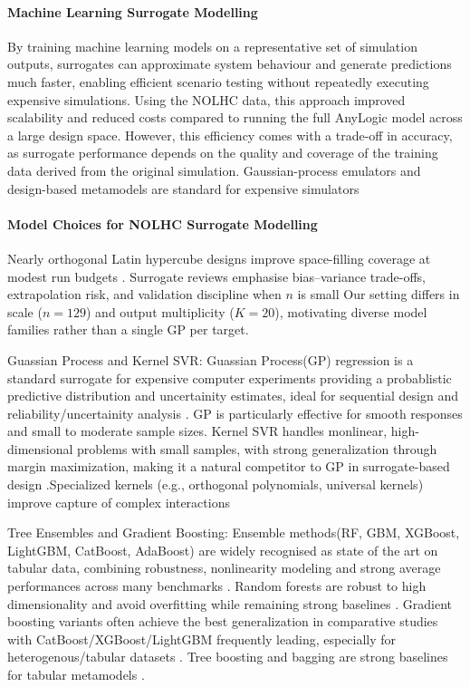 \documentclass[12pt,twocolumn,a4paper]{article}
\theoremstyle{plain}
\theoremstyle{definition}
\theoremstyle{remark}
\begin{document}
\paragraph{Machine Learning Surrogate Modelling}
By training machine learning models on a representative set of simulation outputs, surrogates can approximate system behaviour and generate predictions much faster, enabling efficient scenario testing without repeatedly executing expensive simulations. Using the NOLHC data, this approach improved scalability and reduced costs compared to running the full AnyLogic model across a large design space. However, this efficiency comes with a trade-off in accuracy, as surrogate performance depends on the quality and coverage of the training data derived from the original simulation. Gaussian-process emulators and design-based metamodels are standard for expensive simulators 

\paragraph{Model Choices for NOLHC Surrogate Modelling}
Nearly orthogonal Latin hypercube designs improve space-filling coverage at modest run budgets \citep{cioppa2007,viana2016,bogoclu2021}.
Surrogate reviews emphasise bias--variance trade-offs, extrapolation risk, and validation discipline when $n$ is small 
Our setting differs in scale ($n{=}129$) and output multiplicity ($K{=}20$), motivating diverse model families rather than a single GP per target.
\item Guassian Process and Kernel SVR: Guassian Process(GP) regression is a standard surrogate for expensive computer experiments providing a probablistic predictive distribution and uncertainity estimates, ideal for sequential design and reliability/uncertainity analysis \citep{marrel2024, bogoclu2021, Cheng2017 }. GP is particularly effective for smooth responses and small to moderate sample sizes. Kernel SVR handles monlinear, high-dimensional problems with small samples, with strong generalization through margin maximization, making it a natural competitor to GP in surrogate-based design \citep{Cheng2017}.Specialized kernels (e.g., orthogonal polynomials, universal kernels) improve capture of complex interactions \citep{Ustun2006}

\item Tree Ensembles and Gradient Boosting: Ensemble methods(RF, GBM, XGBoost, LightGBM, CatBoost, AdaBoost) are widely recognised as state of the art on tabular data, combining robustness, nonlinearity modeling and strong average performances across many benchmarks \citep{bentejac2019}. Random forests are robust to high dimensionality and avoid overfitting while remaining strong baselines \citep{marrel2024, Bentejac2024}. Gradient boosting variants often achieve the best generalization in comparative studies with CatBoost/XGBoost/LightGBM frequently leading, especially for heterogenous/tabular datasets \citep{jolicoeur2023, Bentejac2024, mienye2022}. Tree boosting and bagging are strong baselines for tabular metamodels \citep{friedman2001gbm,breiman2001random,bentejac2019,chen2016xgboost,ke2017lightgbm}.
\end{document}
